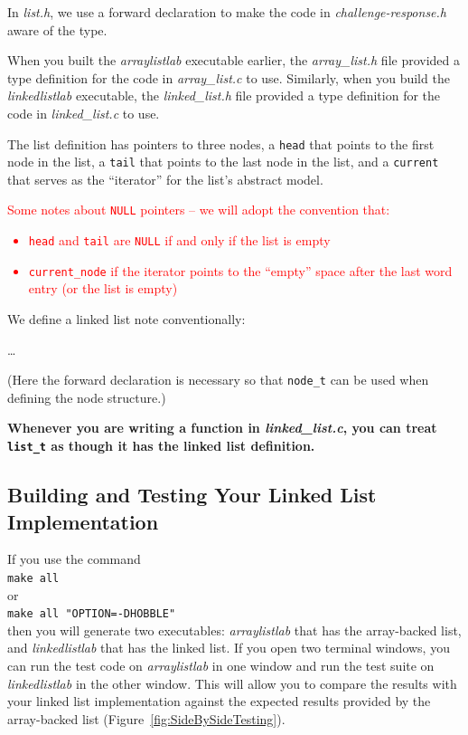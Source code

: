 In \textit{list.h}, we use a forward declaration to make the code in \textit{challenge-response.h} aware of the type.



When you built the \textit{arraylistlab} executable earlier, the \textit{array\_list.h} file provided a type definition for the code in \textit{array\_list.c} to use.
Similarly, when you build the \textit{linkedlistlab} executable, the \textit{linked\_list.h} file provided a type definition for the code in \textit{linked\_list.c} to use.



The list definition has pointers to three nodes, a \lstinline{head} that points to the first node in the list, a \lstinline{tail} that points to the last node in the list, and a \lstinline{current} that serves as the ``iterator'' for the list's abstract model.
\textcolor{red}{
    Some notes about \lstinline{NULL} pointers -- we will adopt the convention that:
    \begin{itemize}
        \item \lstinline{head} and \lstinline{tail} are \lstinline{NULL} if and only if the list is empty
        \item \lstinline{current_node} if the iterator points to the ``empty'' space after the last word entry (or the list is empty)
    \end{itemize}
}

We define a linked list note conventionally:


\dots


(Here the forward declaration is necessary so that \lstinline{node_t} can be used when defining the node structure.)

\textbf{Whenever you are writing a function in \textit{linked\_list.c}, you can treat \lstinline{list_t} as though it has the linked list definition.}


\subsection{Building and Testing Your Linked List Implementation}

If you use the command \\
\verb+make all+ \\
or \\
\verb+make all "OPTION=-DHOBBLE"+ \\
then you will generate two executables: \textit{arraylistlab} that has the array-backed list, and \textit{linkedlistlab} that has the linked list.
If you open two terminal windows, you can run the test code on \textit{arraylistlab} in one window and run the test suite on \textit{linkedlistlab} in the other window.
This will allow you to compare the results with your linked list implementation against the expected results provided by the array-backed list (Figure~\ref{fig:SideBySideTesting}).

